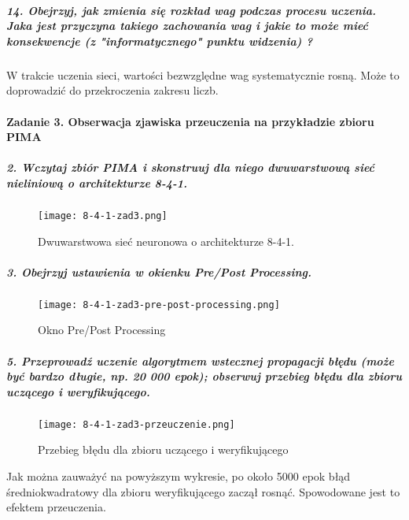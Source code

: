 \documentclass{article}
\begin{document}
\subparagraph{14. Obejrzyj, jak zmienia się rozkład wag podczas procesu uczenia. Jaka jest przyczyna takiego zachowania wag i jakie to może mieć konsekwencje (z "informatycznego" punktu widzenia) ?\\}

W trakcie uczenia sieci, wartości bezwzględne wag systematycznie rosną. Może to doprowadzić do przekroczenia zakresu liczb.

\paragraph{Zadanie 3. Obserwacja zjawiska przeuczenia na przykładzie zbioru PIMA}
\subparagraph{2. Wczytaj zbiór PIMA i skonstruuj dla niego dwuwarstwową sieć nieliniową o architekturze 8-4-1.\\}
\begin{figure}[H]
\begin{center}
\texttt{[image: 8-4-1-zad3.png]}
\end{center}
\caption{Dwuwarstwowa sieć neuronowa o architekturze 8-4-1.}
\label{fig-1Tdelta}
\end{figure}


\subparagraph{3. Obejrzyj ustawienia w okienku Pre/Post Processing.\\}

\begin{figure}[H]
\begin{center}
\texttt{[image: 8-4-1-zad3-pre-post-processing.png]}
\end{center}
\caption{Okno Pre/Post Processing}
\label{fig-1Tdelta}
\end{figure}


\subparagraph{5. Przeprowadź uczenie algorytmem wstecznej propagacji błędu (może być bardzo długie, np. 20 000 epok); obserwuj przebieg błędu dla zbioru uczącego i weryfikującego.\\}

\begin{figure}[H]
\begin{center}
\texttt{[image: 8-4-1-zad3-przeuczenie.png]}
\end{center}
\caption{Przebieg błędu dla zbioru uczącego i weryfikującego}
\label{fig-1Tdelta}
\end{figure}
Jak można zauważyć na powyższym wykresie, po około 5000 epok błąd średniokwadratowy dla zbioru weryfikującego zaczął rosnąć. Spowodowane jest to efektem przeuczenia.  
\end{document}
